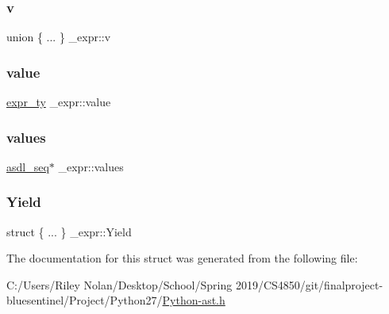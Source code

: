 \mbox{\label{struct__expr_ae63e545ba29feacea603454ebfa92330}} 
\subsubsection{\texorpdfstring{v}{v}}
{\footnotesize\ttfamily union \{ ... \}   \+\_\+expr\+::v}

\mbox{\label{struct__expr_a96f66d087927a7fa74f1e73b37a4e6ac}} 
\subsubsection{\texorpdfstring{value}{value}}
{\footnotesize\ttfamily \mbox{\hyperlink{_python-ast_8h_a56d3705e020a071405094a220c4592bd}{expr\+\_\+ty}} \+\_\+expr\+::value}

\mbox{\label{struct__expr_ac1977025b175b8680fb3283b4881fdd4}} 
\subsubsection{\texorpdfstring{values}{values}}
{\footnotesize\ttfamily \mbox{\hyperlink{structasdl__seq}{asdl\+\_\+seq}}$\ast$ \+\_\+expr\+::values}

\mbox{\label{struct__expr_a9dc9f322a8c3dfdbf739748cb0b63e23}} 
\subsubsection{\texorpdfstring{Yield}{Yield}}
{\footnotesize\ttfamily struct \{ ... \}   \+\_\+expr\+::\+Yield}



The documentation for this struct was generated from the following file\+:\begin{DoxyCompactItemize}
\item 
C\+:/\+Users/\+Riley Nolan/\+Desktop/\+School/\+Spring 2019/\+C\+S4850/git/finalproject-\/bluesentinel/\+Project/\+Python27/\mbox{\hyperlink{_python-ast_8h}{Python-\/ast.\+h}}\end{DoxyCompactItemize}
